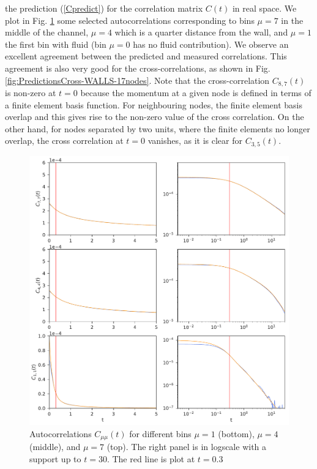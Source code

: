 \documentclass[b5paper,openright,10pt]{book}
\begin{document}
the prediction  (\ref{Cpredict}) for the correlation  matrix $C(t)$ in
real  space.    We  plot  in  Fig.    \ref{fig:Predictions-WALLS-17nodes}  some  selected
autocorrelations corresponding  to bins $\mu=7$  in the middle  of the
channel,  $\mu=4$ which  is  a  quarter distance  from  the wall,  and
$\mu=1$  the  first   bin  with  fluid  (bin  $\mu=0$   has  no  fluid
contribution).   We   observe  an  excellent  agreement   between  the
predicted and measured correlations.  This agreement is also very good
for the  cross-correlations, as shown in  Fig. \ref{fig:PredictionsCross-WALLS-17nodes}. Note
that the  cross-correlation $C_{8,7}(t)$ is non-zero  at $t=0$ because
the momentum at a  given node is defined in terms  of a finite element
basis  function.  For  neighbouring  nodes, the  finite element  basis
overlap  and this  gives  rise  to the  non-zero  value  of the  cross
correlation.  On  the other  hand, for nodes  separated by  two units,
where the finite elements no  longer overlap, the cross correlation at
$t=0$ vanishes, as it is clear for $C_{3,5}(t)$.

\newpage
\begin{figure}[h!]
  \centering
\includegraphics[width=\linewidth]{Predictions-WALLS-17nodes}
\caption[Predicted autocorrelations of $C(t)$ for a confined fluid - Thick bins] {Autocorrelations $C_{\mu\mu}(t)$  for different  bins $\mu=1$
  (bottom),  $\mu=4$  (middle),  and  $\mu=7$ (top).  The  right panel  is  in 
  logscale with a support up to $t=30$. The red line is plot at $t=0.3$}
\label{fig:Predictions-WALLS-17nodes}
\end{figure}
\end{document}
